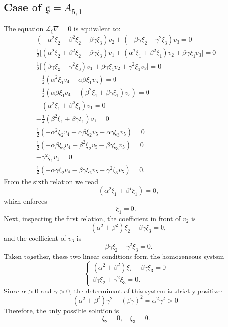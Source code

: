 \documentclass[10pt]{article}
\begin{document}
\subsection{Case of $\mathfrak{g}=A_{5,1}$}

The equation $\mathscr{L}_\xi\nabla=0$ is equivalent to: \begin{eqnarray}
 (-\alpha^2\xi_2 - \beta^2\xi_2 - \beta\gamma\xi_3)v_2 + (-\beta\gamma\xi_2 - \gamma^2\xi_3)v_3  =0\\
\tfrac{1}{2}\Big[(\alpha^2\xi_2 + \beta^2\xi_2 + \beta\gamma\xi_3)v_1 + (\alpha^2\xi_1 + \beta^2\xi_1)v_2 + \beta\gamma\xi_1v_3\Big]  =0\\
\tfrac{1}{2}\Big[(\beta\gamma\xi_2 + \gamma^2\xi_3)v_1 + \beta\gamma\xi_1v_2 + \gamma^2\xi_1v_3\Big]=0\\
-\tfrac{1}{2}(\alpha^2\xi_1v_4 + \alpha\beta\xi_1v_5)=0\\ -\tfrac{1}{2}(\alpha\beta\xi_1v_4 + (\beta^2\xi_1 + \beta\gamma\xi_1)v_5) =0\\
-(\alpha^2\xi_1 + \beta^2\xi_1)v_1 =0\\
-\tfrac{1}{2}(\beta^2\xi_1 + \beta\gamma\xi_1)v_1=0\\
\tfrac{1}{2}(-\alpha^2\xi_2v_4 - \alpha\beta\xi_2v_5 - \alpha\gamma\xi_3v_5)=0\\
\tfrac{1}{2}(-\alpha\beta\xi_2v_4 - \beta^2\xi_2v_5 - \beta\gamma\xi_3v_5)=0\\
-\gamma^2\xi_1v_1=0\\ 
\tfrac{1}{2}(-\alpha\gamma\xi_2v_4 - \beta\gamma\xi_2v_5 - \gamma^2\xi_3v_5) =0.
\end{eqnarray}
From the sixth relation we read
\[
-(\alpha^2\xi_1 + \beta^2\xi_1) = 0,
\]
which enforces
\[
\xi_1 = 0.
\]
Next, inspecting the first relation, the coefficient in front of \(v_2\) is
\[
-(\alpha^2+\beta^2)\xi_2 - \beta\gamma\xi_3 = 0,
\]
and the coefficient of \(v_3\) is
\[
-\beta\gamma\xi_2 - \gamma^2\xi_3 = 0.
\]
Taken together, these two linear conditions form the homogeneous system
\[
\begin{cases}
(\alpha^2+\beta^2)\xi_2 + \beta\gamma \xi_3 = 0\\
\beta\gamma \xi_2 + \gamma^2 \xi_3 = 0.
\end{cases}
\]
Since \(\alpha>0\) and \(\gamma>0\), the determinant of this system is strictly positive:
\[
(\alpha^2+\beta^2)\gamma^2 - (\beta\gamma)^2 = \alpha^2\gamma^2 > 0.
\]
Therefore, the only possible solution is
\[
\xi_2 = 0, \quad \xi_3 = 0.
\]

\medskip
\end{document}
